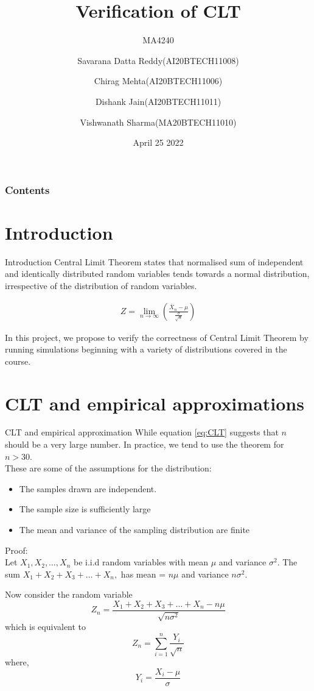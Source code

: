 \documentclass[10pt]{beamer}
\title{Verification of CLT}
\subtitle{MA4240}
\author[]{ Savarana Datta Reddy(AI20BTECH11008)  \and Chirag Mehta(AI20BTECH11006)
\and Dishank Jain(AI20BTECH11011) \and Vishwanath Sharma(MA20BTECH11010)}
\institute{IIT Hyderabad}
\date{April 25 2022}
\begin{document}
\frame{\titlepage}
\begin{frame}
\frametitle{Contents}
\tableofcontents
\end{frame}
\section{Introduction}
\begin{frame}{Introduction}
Central Limit Theorem states that normalised sum of independent and identically distributed random variables tends towards a normal distribution, irrespective of the distribution of random variables.
\begin{block}

\begin{align}
    Z = \lim_{n \to \infty} \left(\frac{\bar{X}_n-\mu}{\frac{\sigma}{\sqrt{n}}}\right) \label{eq:CLT}
\end{align}
\end{block}

In this project, we propose to verify the correctness of Central Limit Theorem by running simulations beginning with a variety of distributions covered in the course.
\end{frame}


\section{CLT and empirical approximations}
\begin{frame}{CLT and empirical approximation}
    While equation \eqref{eq:CLT} suggests that $n$ should be a very large number. In practice, we tend to use the theorem for $n>30$.\\
These are some of the assumptions for the distribution:
\begin{itemize}
\item  The samples drawn are independent.
\item  The sample size is sufficiently large
\item  The mean and variance of the sampling distribution are finite
\end{itemize}
\end{frame}
\begin{frame}{}
Proof:\\
Let $X_1,X_2,\dots,X_n$ be i.i.d random variables with mean $\mu$ and variance $\sigma^2$.
The sum $X_1+X_2+X_3+\dots+X_n,$ has mean = $n\mu$ and variance $n\sigma^2$.

Now consider the random variable 
\begin{equation}
    Z_n = \frac{X_1+X_2+X_3+\dots+X_n - n\mu}{\sqrt{n\sigma^2}}
\end{equation}
which is equivalent to 
\begin{equation}
    Z_n = \sum_{i=1}^n \frac{Y_i}{\sqrt{n}}
\end{equation}
where,
\begin{equation}
    Y_i = \frac{X_i-\mu}{\sigma}\label{a}
\end{equation}
\end{frame}
\end{document}
